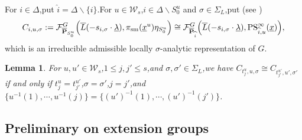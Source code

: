 \documentclass[10pt]{article}
\newtheorem{lem}[thm]{Lemma}
\newcommand{\op}{{\overline{{\mathbf{P}}}}}
\newcommand{\sm}{{\rm sm}}
\newcommand{\gen}{{\rm gen}}
\newcommand{\bh}{{\mathbf{h}}}
\newcommand{\cF}{\mathcal F}
\newcommand{\sW}{\mathscr W}
\begin{document}
For $i\in \Delta$,\;put $\widehat{i}=\Delta\backslash\{i\}$.\;For $u\in \sW_s$,\;$i\in \Delta\backslash S_0^u$ and $\sigma\in \Sigma_L$,\;put (see \cite[The main theorem]{orlik2015jordan})
\[C_{i,u,\sigma}:=\cF^{G}_{\op_{S^u_0}}\Big(\overline{L}(-s_{i,\sigma}\cdot\underline{\lambda}),\pi_{\sm}(\underline{x}^u)\eta_{S^u_0}\Big)\cong \cF^{G}_{\op_{\widehat{i}}}\Big(\overline{L}(-s_{i,\sigma}\cdot\underline{\lambda}),\mathrm{PS}^{\infty}_{\widehat{i},u}(\underline{x})\Big),\]
which is an irreducible admissible locally $\sigma$-analytic representation of $G$.\;






\begin{lem}For $u,u'\in \sW_s$,\;$1\leq j,j'\leq s$,\;and $\sigma,\sigma'\in \Sigma_L$,\;we have $C_{t^u_j,u,\sigma}\cong C_{t^{u'}_{j'},u',\sigma'}$ if and only if $t^u_j=t^{u'}_{j'}$,\;$\sigma=\sigma'$,\;$j=j'$,\;and $\{u^{-1}(1),\cdots,u^{-1}(j)\}=\{(u')^{-1}(1),\cdots,(u')^{-1}(j')\}$.\;
\end{lem}










\subsection{Preliminary on extension groups}


\end{document}
